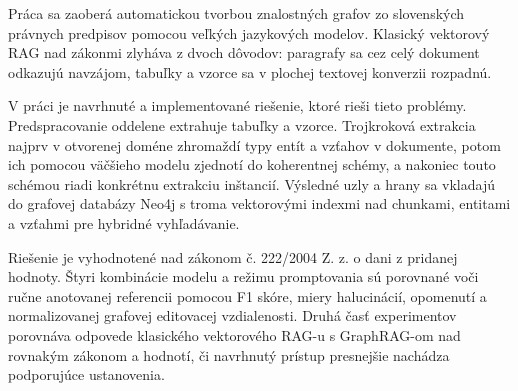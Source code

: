 Práca sa zaoberá automatickou tvorbou znalostných grafov zo slovenských právnych predpisov pomocou veľkých jazykových modelov. Klasický vektorový RAG nad zákonmi zlyháva z dvoch dôvodov: paragrafy sa cez celý dokument odkazujú navzájom, tabuľky a vzorce sa v plochej textovej konverzii rozpadnú.

V práci je navrhnuté a implementované riešenie, ktoré rieši tieto problémy. Predspracovanie oddelene extrahuje tabuľky a vzorce. Trojkroková extrakcia najprv v otvorenej doméne zhromaždí typy entít a vzťahov v dokumente, potom ich pomocou väčšieho modelu zjednotí do koherentnej schémy, a nakoniec touto schémou riadi konkrétnu extrakciu inštancií. Výsledné uzly a hrany sa vkladajú do grafovej databázy Neo4j s troma vektorovými indexmi nad chunkami, entitami a vzťahmi pre hybridné vyhľadávanie.

Riešenie je vyhodnotené nad zákonom č. 222/2004 Z. z. o dani z pridanej hodnoty. Štyri kombinácie modelu a režimu promptovania sú porovnané voči ručne anotovanej referencii pomocou F1 skóre, miery halucinácií, opomenutí a normalizovanej grafovej editovacej vzdialenosti. Druhá časť experimentov porovnáva odpovede klasického vektorového RAG-u s GraphRAG-om nad rovnakým zákonom a hodnotí, či navrhnutý prístup presnejšie nachádza podporujúce ustanovenia.
